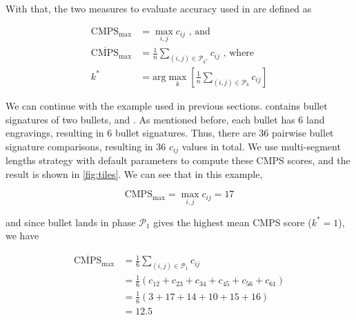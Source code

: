 With that, the two measures to evaluate accuracy used in \citet{cmps}
are defined as

\begin{align}
\mathrm{CMPS_{max}} &= \max_{i,j} c_{ij} \text{ , and} \\
\mathrm{\overline{CMPS}_{max}} &= \frac{1}{n} \sum_{(i,j) \in \mathcal{P}_{k^*}} c_{ij} \text{ , where} \\
k^* &= \text{arg}\max\limits_{k} \left[  \frac{1}{n} \sum_{(i,j) \in \mathcal{P}_k} c_{ij}\right]
\end{align}

We can continue with the example used in previous sections.
 contains bullet signatures of two bullets, 
and . As mentioned before, each bullet has 6 land
engravings, resulting in 6 bullet signatures. Thus, there are 36
pairwise bullet signature comparisons, resulting in 36 \(c_{ij}\) values
in total. We use multi-segment lengths strategy with default parameters
to compute these CMPS scores, and the result is shown in
\autoref{fig:tiles}. We can see that in this example,

\[
\mathrm{CMPS_{max}} =  \max_{i,j} c_{ij} = 17
\]

and since bullet lands in phase \(\mathcal{P}_1\) gives the highest mean
CMPS score (\(k^* = 1\)), we have

\[
\begin{aligned}
\mathrm{\overline{CMPS}_{max}} &= \frac{1}{6} \sum_{(i,j) \in \mathcal{P}_1} c_{ij} \\
                        &= \frac{1}{6} (c_{12} + c_{23} + c_{34} + c_{45} + c_{56} + c_{61}) \\
                        &= \frac{1}{6} (3+17+14+10+15+16) \\
                        &= 12.5
\end{aligned}
\]

